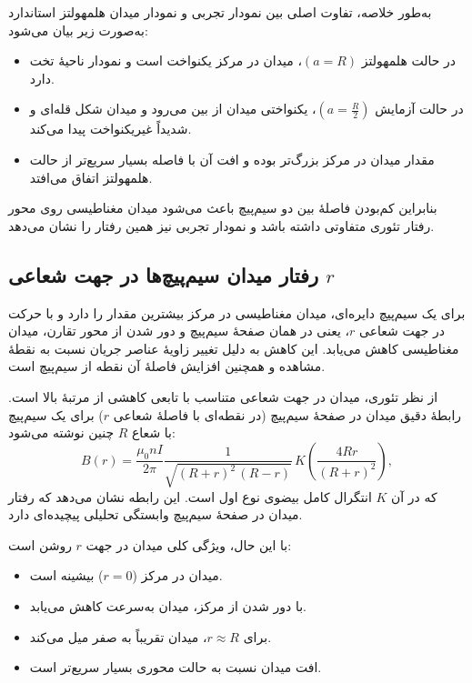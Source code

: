 \documentclass[a4paper, 11pt]{article}
\begin{document}
به‌طور خلاصه، تفاوت اصلی بین نمودار تجربی و نمودار میدان هلمهولتز استاندارد به‌صورت زیر بیان می‌شود:
\begin{itemize}
    \item در حالت هلمهولتز \((a=R)\)، میدان در مرکز یکنواخت است و نمودار ناحیهٔ تخت دارد.
    \item در حالت آزمایش \((a=\tfrac{R}{2})\)، یکنواختی میدان از بین می‌رود و میدان شکل قله‌ای و شدیداً غیریکنواخت پیدا می‌کند.
    \item مقدار میدان در مرکز بزرگ‌تر بوده و افت آن با فاصله بسیار سریع‌تر از حالت هلمهولتز اتفاق می‌افتد.
\end{itemize}

بنابراین کم‌بودن فاصلهٔ بین دو سیم‌پیچ باعث می‌شود میدان مغناطیسی روی محور رفتار تئوری متفاوتی داشته باشد و نمودار تجربی نیز همین رفتار را نشان می‌دهد.

\subsection{رفتار میدان سیم‌پیچ‌ها در جهت شعاعی \texorpdfstring{$r$}{r}}

برای یک سیم‌پیچ دایره‌ای، میدان مغناطیسی در مرکز بیشترین مقدار را دارد و با حرکت در جهت شعاعی \(r\)، یعنی در همان صفحهٔ سیم‌پیچ و دور شدن از محور تقارن، میدان مغناطیسی کاهش می‌یابد. این کاهش به دلیل تغییر زاویهٔ عناصر جریان نسبت به نقطهٔ مشاهده و همچنین افزایش فاصلهٔ آن نقطه از سیم‌پیچ است.

از نظر تئوری، میدان در جهت شعاعی متناسب با تابعی کاهشی از مرتبهٔ بالا است. رابطهٔ دقیق میدان در صفحهٔ سیم‌پیچ (در نقطه‌ای با فاصلهٔ شعاعی \(r\)) برای یک سیم‌پیچ با شعاع \(R\) چنین نوشته می‌شود:
\begin{equation}
B(r)
=
\frac{\mu_0 n I}{2\pi}
\frac{1}{\sqrt{(R+r)^2 \, (R-r)}}
\, K\!\left( \frac{4 R r}{(R+r)^2} \right),
\end{equation}
که در آن \(K\) انتگرال کامل بیضوی نوع اول است. این رابطه نشان می‌دهد که رفتار میدان در صفحهٔ سیم‌پیچ وابستگی تحلیلی پیچیده‌ای دارد.

با این حال، ویژگی کلی میدان در جهت \(r\) روشن است:
\begin{itemize}
    \item میدان در مرکز (\(r=0\)) بیشینه است.
    \item با دور شدن از مرکز، میدان به‌سرعت کاهش می‌یابد.
    \item برای \(r \approx R\)، میدان تقریباً به صفر میل می‌کند.
    \item افت میدان نسبت به حالت محوری بسیار سریع‌تر است.
\end{itemize}
\end{document}
